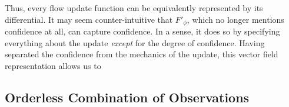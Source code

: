 Thus, every flow update function can be equivalently represented
by its differential.
% 
% 
It may seem counter-intuitive that $F'_\phi$,
which no longer mentions confidence at all,
can capture confidence. In a sense, it does so by specifying 
everything about the update \emph{except} for the degree of confidence.
Having separated the confidence from the mechanics of the update,
this vector field representation allows us to 

\subsection{Orderless Combination of Observations}

